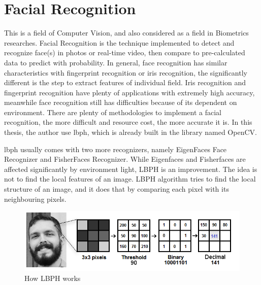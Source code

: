 \section{Facial Recognition}
This is a field of Computer Vision, and also considered as a field in Biometrics researches. Facial Recognition is the technique implemented to detect and recognize face(s) in photos or real-time video, then compare to pre-calculated data to predict with probability. In general, face recognition has similar characteristics with fingerprint recognition or iris recognition, the significantly different is the step to extract features of individual field. Iris recognition and fingerprint recognition have plenty of applications with extremely high accuracy, meanwhile face recognition still has difficulties because of its dependent on environment. There are plenty of methodologies to implement a facial recognition, the more difficult and resource cost, the more accurate it is. In this thesis, the author use \gls{lbph}, which is already built in the library named OpenCV.

\gls{lbph} usually comes with two more recognizers, namely EigenFaces Face Recognizer and FisherFaces Recognizer. While Eigenfaces and Fisherfaces are affected significantly by environment light, LBPH is an improvement. The idea is not to find the local features of an image. LBPH algorithm tries to find the local structure of an image, and it does that by comparing each pixel with its neighbouring pixels.
\begin{figure}[!ht]
  \begin{center}
    \includegraphics[scale=0.6]{images/lbph.png}
    \caption{How LBPH works}
    \label{fig:lbph1}
  \end{center}
\end{figure}

